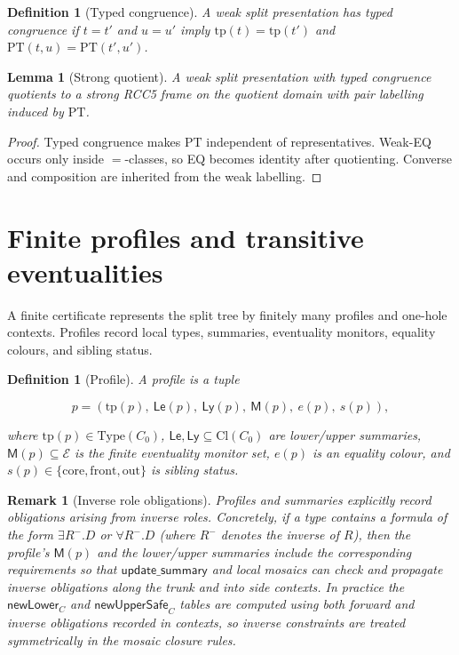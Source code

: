 \documentclass[11pt]{article}
\newcommand{\Cl}{\mathrm{Cl}}
\newcommand{\tp}{\mathrm{tp}}
\newtheorem{lemma}[theorem]{Lemma}
\newtheorem{definition}[theorem]{Definition}
\newtheorem{remark}[theorem]{Remark}
\begin{document}
\begin{definition}[Typed congruence]
A weak split presentation has typed congruence if $t=t'$ and $u=u'$ imply
$\tp(t)=\tp(t')$ and $\mathrm{PT}(t,u)=\mathrm{PT}(t',u')$.
\end{definition}

\begin{lemma}[Strong quotient]
\label{lem:strong-quotient}
A weak split presentation with typed congruence quotients to a strong RCC5
frame on the quotient domain with pair labelling induced by $\mathrm{PT}$.
\end{lemma}

\begin{proof}
Typed congruence makes $\mathrm{PT}$ independent of representatives. Weak-EQ
occurs only inside $=$-classes, so EQ becomes identity after quotienting.
Converse and composition are inherited from the weak labelling.
\end{proof}

\section{Finite profiles and transitive eventualities}
\label{sec:profiles}

A finite certificate represents the split tree by finitely many profiles and
one-hole contexts. Profiles record local types, summaries, eventuality monitors,
equality colours, and sibling status.

\begin{definition}[Profile]
A profile is a tuple


\[
p=(\tp(p),\ \mathsf{Le}(p),\ \mathsf{Ly}(p),\ \mathsf{M}(p),\ e(p),\ s(p)),
\]


where $\tp(p)\in\mathrm{Type}(C_0)$, $\mathsf{Le},\mathsf{Ly}\subseteq\Cl(C_0)$
are lower/upper summaries, $\mathsf{M}(p)\subseteq\mathcal{E}$ is the finite
eventuality monitor set, $e(p)$ is an equality colour, and
$s(p)\in\{\mathrm{core},\mathrm{front},\mathrm{out}\}$ is sibling status.

\end{definition}


\begin{remark}[Inverse role obligations]
Profiles and summaries explicitly record obligations arising from inverse roles.
Concretely, if a type contains a formula of the form $\exists R^{-}.D$ or
$\forall R^{-}.D$ (where $R^{-}$ denotes the inverse of $R$), then the
profile's $\mathsf{M}(p)$ and the lower/upper summaries include the corresponding
requirements so that $\mathsf{update\_summary}$ and local mosaics can check
and propagate inverse obligations along the trunk and into side contexts.
In practice the $\mathsf{newLower}_C$ and $\mathsf{newUpperSafe}_C$ tables are
computed using both forward and inverse obligations recorded in contexts,
so inverse constraints are treated symmetrically in the mosaic closure rules.
\end{remark}
\end{document}

